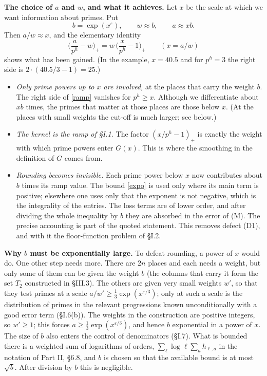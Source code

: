 \documentclass[11pt,letterpaper]{article}
\begin{document}
\textbf{The choice of $a$ and $w$, and what it achieves.} Let $x$ be the scale at which we want information
about primes. Put
\begin{equation}\label{D:20}
 b=\exp(x^\varepsilon),\qquad w\approx b,\qquad a\approx xb .
\end{equation}
Then $a/w\approx x$, and the elementary identity
\begin{equation}\label{ramp}
 \Big(\frac a{p^h}-w\Big)_+=w\,\Big(\frac{x}{p^h}-1\Big)_+\qquad(x=a/w)
\end{equation}
shows what has been gained. (In the example, $x=40.5$ and for $p^h=3$ the right side is
$2\cdot(40.5/3-1)=25$.)
\begin{itemize}
\item \emph{Only prime powers up to $x$ are involved,} at the places that carry the weight $b$. The right
side of \eqref{ramp} vanishes for $p^h\ge x$. Although we differentiate about $xb$ times, the primes that
matter at those places are those below $x$. (At the places with small weights the cut-off is much larger;
see below.)
\item \emph{The kernel is the ramp of \S I.1.} The factor $(x/p^h-1)_+$ is exactly the weight with which
prime powers enter $G(x)$. This is where the smoothing in the definition of $G$ comes from.
\item \emph{Rounding becomes invisible.} Each prime power below $x$ now contributes about $b$ times its
ramp value. The bound \eqref{expo} is used only where its main term is positive; elsewhere one uses only
that the exponent is not negative, which is the integrality of the entries. The loss terms are of lower
order, and after dividing the whole inequality by $b$ they are absorbed in the error of (M). The
precise accounting is part of the quoted statement. This removes defect (D1), and with it the
floor-function problem of \S I.2.
\end{itemize}

\textbf{Why $b$ must be exponentially large.} To defeat rounding, a power of $x$ would do.
One other step needs more. There are $2n$ places and each needs a weight, but only some of them can
be given the weight $b$ (the columns that carry it form the set $T_2$ constructed in \S III.3). The others are given very small weights $w'$, so that they test primes at a scale
$a/w'\ge\frac13\exp(x^{\varepsilon/3})$; only at such a scale is the distribution of primes in the relevant
progressions known unconditionally with a good error term (\S I.6(b)). The weights in the construction are positive integers, so
$w'\ge1$; this forces $a\ge\frac13\exp(x^{\varepsilon/3})$, and hence $b$ exponential in a power of $x$. The size of $b$ also enters the control of denominators (\S I.7).
What is bounded there is a weighted sum of logarithms of orders, $\sum_\ell\log\ell\sum_ah_{\ell,a}$ in the
notation of Part II, \S6.8, and $b$ is chosen so that the available bound is at most $\sqrt b$. After division
by $b$ this is negligible.
\end{document}
